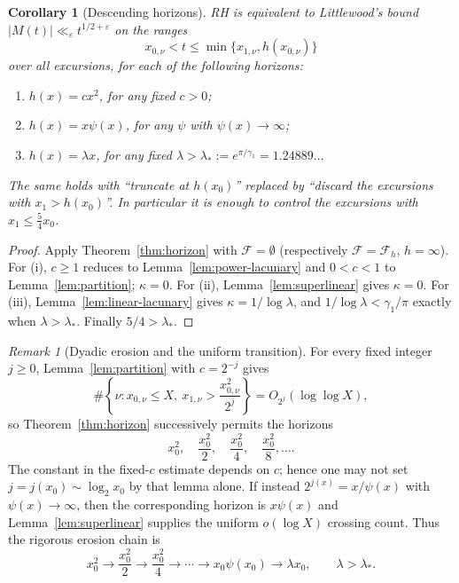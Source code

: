 \documentclass[11pt]{amsart}
\numberwithin{equation}{section}
\theoremstyle{plain}
\newtheorem{corollary}[theorem]{Corollary}
\theoremstyle{definition}
\theoremstyle{remark}
\newtheorem{remark}[theorem]{Remark}
\newcommand{\eps}{\varepsilon}
\newcommand{\F}{\mathcal{F}}
\begin{document}
\begin{corollary}[Descending horizons]
\label{cor:descending}
\label{cor:linear-ordinary-RH}
RH is equivalent to Littlewood's bound
$|M(t)|\ll_\eps t^{1/2+\eps}$ on the ranges
\[
x_{0,\nu}<t\le\min\{x_{1,\nu},h(x_{0,\nu})\}
\]
over all excursions, for each of the following horizons:
\begin{enumerate}[label=\textup{(\roman*)}]
\item $h(x)=cx^2$, for any fixed $c>0$;
\item $h(x)=x\psi(x)$, for any $\psi$ with $\psi(x)\to\infty$;
\item $h(x)=\lambda x$, for any fixed $\lambda>\lambda_*:=e^{\pi/\gamma_1}=1.24889\ldots$
\end{enumerate}
The same holds with ``truncate at $h(x_0)$'' replaced by ``discard the
excursions with $x_1>h(x_0)$''. In particular it is enough to control the
excursions with $x_1\le\frac54x_0$.
\end{corollary}

\begin{proof}
Apply Theorem~\ref{thm:horizon} with $\F=\emptyset$ (respectively
$\F=\F_h$, $h=\infty$). For (i), $c\ge1$ reduces to
Lemma~\ref{lem:power-lacunary} and $0<c<1$ to Lemma~\ref{lem:partition};
$\kappa=0$. For (ii), Lemma~\ref{lem:superlinear} gives $\kappa=0$. For
(iii), Lemma~\ref{lem:linear-lacunary} gives $\kappa=1/\log\lambda$, and
$1/\log\lambda<\gamma_1/\pi$ exactly when $\lambda>\lambda_*$. Finally
$5/4>\lambda_*$.
\end{proof}

\begin{remark}[Dyadic erosion and the uniform transition]
\label{rem:dyadic-erosion}
For every fixed integer $j\ge0$, Lemma~\ref{lem:partition} with
$c=2^{-j}$ gives
\[
\#\left\{\nu:x_{0,\nu}\le X,\ x_{1,\nu}>
\frac{x_{0,\nu}^2}{2^j}\right\}=O_{2^j}(\log\log X),
\]
so Theorem~\ref{thm:horizon} successively permits the horizons
\[
x_0^2,\quad \frac{x_0^2}{2},\quad \frac{x_0^2}{4},\quad
\frac{x_0^2}{8},\ldots.
\]
The constant in the fixed-$c$ estimate depends on $c$; hence one may not set
$j=j(x_0)\sim\log_2x_0$ by that lemma alone.  If instead
$2^{j(x)}=x/\psi(x)$ with $\psi(x)\to\infty$, then the corresponding
horizon is $x\psi(x)$ and Lemma~\ref{lem:superlinear} supplies the uniform
$o(\log X)$ crossing count.  Thus the rigorous erosion chain is
\[
x_0^2\to\frac{x_0^2}{2}\to\frac{x_0^2}{4}\to\cdots
\to x_0\psi(x_0)\to\lambda x_0,\qquad\lambda>\lambda_*.
\]
\end{remark}
\end{document}
